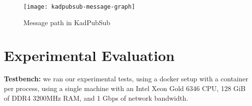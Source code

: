 \documentclass[sigconf]{acmart}
\begin{document}
\begin{figure}[h]
    \centering
    \texttt{[image: kadpubsub-message-graph]}
    \caption{Message path in KadPubSub}
    \label{fig:kadpubsub-message-graph}
\end{figure}


\section{Experimental Evaluation}

\textbf{Testbench:} we ran our experimental tests, using a docker setup with a container per process, using a single machine with an Intel Xeon Gold 6346 CPU, 128 GiB of DDR4 3200MHz RAM, and 1 Gbps of network bandwidth. 

\end{document}
